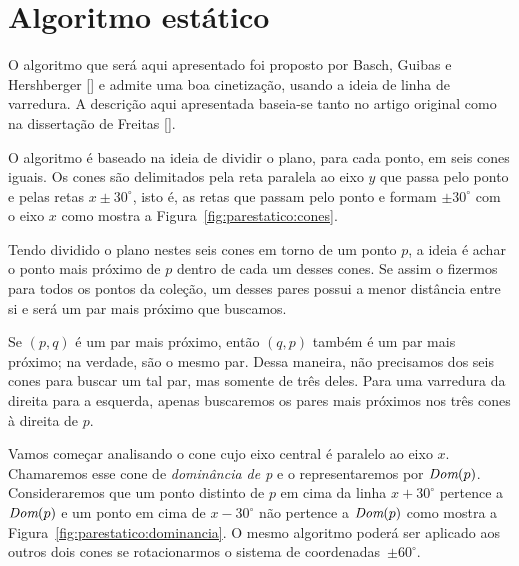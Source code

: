 
\FloatBarrier


\section{Algoritmo estático}\label{sec:algoritmo-estatico}

O algoritmo que será aqui apresentado foi proposto por Basch, Guibas
e Hershberger [\cite{BASCH19991}] e admite uma boa cinetização, usando a ideia de linha
de varredura.
A descrição aqui apresentada baseia-se tanto no artigo original como na dissertação de Freitas
[\cite{eduardo}].

O algoritmo é baseado na ideia de dividir o plano, para cada ponto, em seis cones iguais.
Os cones são delimitados pela reta paralela ao eixo $y$ que passa pelo ponto e pelas retas $x \pm
30^\circ$, isto é, as retas que passam pelo ponto e formam $\pm 30^\circ$ com o eixo $x$ como mostra a
Figura~\ref{fig:parestatico:cones}.



Tendo dividido o plano nestes seis cones em torno de um ponto $p$, a ideia é achar o ponto mais
próximo de $p$ dentro de cada um desses cones.
Se assim o fizermos para todos os pontos da coleção, um desses pares possui a menor distância
entre si e será um par mais próximo que buscamos.

Se $(p, q)$ é um par mais próximo, então $(q, p)$ também é um par mais próximo;
na verdade, são o mesmo par.
Dessa maneira, não precisamos dos seis cones para buscar um tal par, mas somente de três deles.
Para uma varredura da direita para a esquerda, apenas buscaremos os pares mais próximos nos três
cones à direita de $p$.

Vamos começar analisando o cone cujo eixo central é paralelo ao eixo $x$.
Chamaremos esse cone de \textit{dominância de p} e o representaremos por $\textit{Dom}(p)$.
Consideraremos que um ponto distinto de $p$ em cima da linha $x + 30^\circ$ pertence a $\textit{Dom}(p)$ e um
ponto em cima de $x - 30^\circ$ não pertence a $\textit{Dom}(p)$ como mostra a
Figura~\ref{fig:parestatico:dominancia}.
O mesmo algoritmo poderá ser aplicado aos outros dois cones se rotacionarmos o sistema de
coordenadas~$\pm 60^\circ$.



